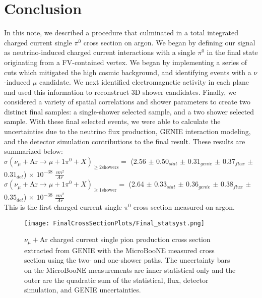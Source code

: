 \clearpage 
 \section{Conclusion}
In this note, we described a procedure that culminated in a total integrated charged current single $\pi^0$ cross section on argon. We began by defining our signal as neutrino-induced charged current interactions with a single $\pi^0$ in the final state originating from a FV-contained vertex.  We began by implementing a series of cuts which mitigated the high cosmic background, and identifying events with a $\nu$-induced $\mu$ candidate.  We next identified electromagnetic activity in each plane and used this information to reconstruct 3D shower candidates. Finally, we considered a variety of spatial correlations and shower parameters to create two distinct final samples: a single-shower selected sample, and a two shower selected sample.  With these final selected events, we were able to calculate the uncertainties due to the neutrino flux production, GENIE interaction modeling, and the detector simulation contributions to the final result.  These results are summarized below:\\

\noindent $\sigma\left(\nu_{\mu} + \text{Ar} \rightarrow \mu + 1 \pi^{0} + X\right)_{\geq 2 \text{showers}}=$ (2.56 $\pm$ $0.50_{stat}$ $\pm$ $0.31_{genie}$ $\pm$ $0.37_{flux}$ $\pm$ $0.31_{det}$) $\times$ $10^{-38}$ $\frac{cm^2}{Ar}$ \\

\noindent $\sigma\left(\nu_{\mu} + \text{Ar} \rightarrow \mu + 1 \pi^{0} + X\right)_{\geq 1 \text{shower}}=$ (2.64 $\pm$ $0.33_{stat}$ $\pm$ $0.36_{genie}$ $\pm$ $0.38_{flux}$ $\pm$ $0.35_{det}$) $\times$ $10^{-38}$ $\frac{cm^2}{Ar}$ \\

\noindent This is the first charged current single $\pi^0$ cross section measured on argon.

\begin{figure}[h!]
\centering
\texttt{[image: FinalCrossSectionPlots/Final\_statsyst.png]}
\caption{ $\nu_{\mu}+\text{Ar}$ charged current single pion production cross section extracted from GENIE with the MicroBooNE measured cross section using the two- and one-shower paths. The uncertainty bars on the MicroBooNE measurements are inner statistical only and the outer are the quadratic sum of the statistical, flux, detector simulation, and GENIE uncertainties.}
\label{fig:genie_uboone_xsec2}
\end{figure}



